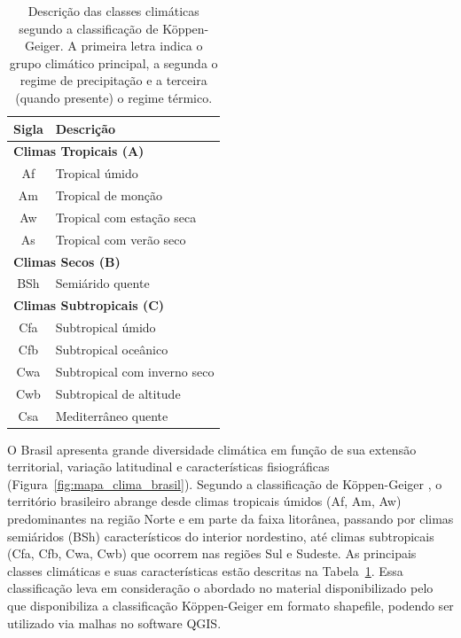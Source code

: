 \begin{table}[h!]
\centering
\caption[Descrição das classes climáticas segundo a classificação de Köppen-Geiger]{Descrição das classes climáticas segundo a classificação de Köppen-Geiger. 
A primeira letra indica o grupo climático principal, a segunda o regime de precipitação 
e a terceira (quando presente) o regime térmico.}
\label{tab:koppen_classes}

\renewcommand{\arraystretch}{1.2} %

\begin{tabular}{cl}
\hline
\textbf{Sigla} & \textbf{Descrição} \\
\hline

\multicolumn{2}{l}{\textbf{Climas Tropicais (A)}} \\
Af  & Tropical úmido \\
Am  & Tropical de monção \\
Aw  & Tropical com estação seca \\
As  & Tropical com verão seco \\[4pt]

\multicolumn{2}{l}{\textbf{Climas Secos (B)}} \\
BSh & Semiárido quente \\[4pt]

\multicolumn{2}{l}{\textbf{Climas Subtropicais (C)}} \\
Cfa & Subtropical úmido \\
Cfb & Subtropical oceânico \\
Cwa & Subtropical com inverno seco \\
Cwb & Subtropical de altitude \\
Csa & Mediterrâneo quente \\

\hline
\end{tabular}
\end{table}


O Brasil apresenta grande diversidade climática em função de sua extensão territorial, variação latitudinal e características fisiográficas (Figura~\ref{fig:mapa_clima_brasil}). Segundo a classificação de Köppen-Geiger \citep{alvares2013, Kottek2006}, o território brasileiro abrange desde climas tropicais úmidos (Af, Am, Aw) predominantes na região Norte e em parte da faixa litorânea, passando por climas semiáridos (BSh) característicos do interior nordestino, até climas subtropicais (Cfa, Cfb, Cwa, Cwb) que ocorrem nas regiões Sul e Sudeste. As principais classes climáticas e suas características estão descritas na Tabela~\ref{tab:koppen_classes}. Essa classificação leva em consideração o abordado no material disponibilizado pelo \cite{forestgis2015} que disponibiliza a classificação Köppen-Geiger em formato shapefile, podendo ser utilizado via malhas no software QGIS.

